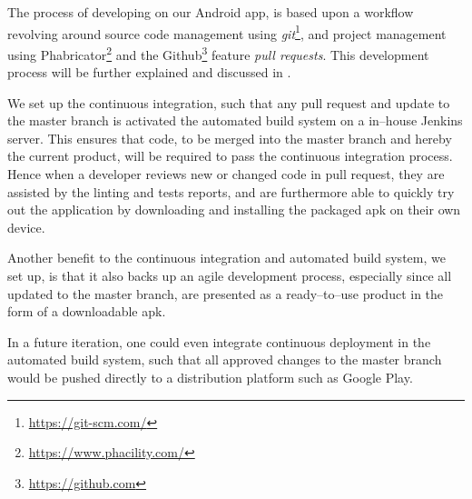 The process of developing on our Android app, is based upon a workflow revolving around source code management using \textit{git}\footnote{\url{https://git-scm.com/}}, and project management using Phabricator\footnote{\url{https://www.phacility.com/}} and the Github\footnote{\url{https://github.com}} feature \textit{pull requests}.
This development process will be further explained and discussed in .

We set up the continuous integration, such that any pull request and update to the master branch is activated the automated build system on a in--house Jenkins server.
This ensures that code, to be merged into the master branch and hereby the current product, will be required to pass the continuous integration process.
Hence when a developer reviews new or changed code in pull request, they are assisted by the linting and tests reports, and are furthermore able to quickly try out the application by downloading and installing the packaged apk on their own device.

\bigskip
Another benefit to the continuous integration and automated build system, we set up, is that it also backs up an agile development process, especially since all updated to the master branch, are presented as a ready--to--use product in the form of a downloadable apk.

In a future iteration, one could even integrate continuous deployment in the automated build system, such that all approved changes to the master branch would be pushed directly to a distribution platform such as Google Play.
